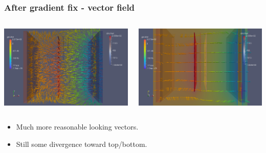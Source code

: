 \documentclass[xcolor=dvipsnames]{beamer}
\begin{document}
\begin{frame}
  \frametitle{After gradient fix - vector field}
  \begin{columns}
    \begin{column}{0.5\textwidth}
      \includegraphics[width=\textwidth]{twodee-fine-arrows-plan-fixgrad.png}      
    \end{column}
    \begin{column}{0.5\textwidth}
      \includegraphics[width=\textwidth]{twodee-fine-arrows-side-fixgrad.png}      
    \end{column}
  \end{columns}
  \footnotesize
  \begin{itemize}
  \item Much more reasonable looking vectors.
  \item Still some divergence toward top/bottom.
  \end{itemize}
\end{frame}
\end{document}
